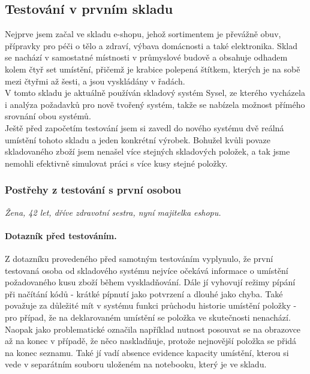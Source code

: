 \subsection{Testování v prvním skladu}

Nejprve jsem začal ve skladu e-shopu, jehož sortimentem je převážně obuv, přípravky pro péči o tělo a zdraví, výbava domácnosti a také elektronika. Sklad se nachází v samostatné místnosti v průmyslové budově a obsahuje odhadem kolem čtyř set umístění, přičemž  je krabice polepená štítkem, kterých je na sobě mezi čtyřmi až šesti, a jsou vyskládány v řadách.\\
V tomto skladu je aktuálně používán skladový systém Sysel, ze kterého vycházela i analýza požadavků pro nově tvořený systém, takže se nabízela možnost přímého srovnání obou systémů.\\
Ještě před započetím testování jsem si zavedl do nového systému dvě reálná umístění tohoto skladu a jeden konkrétní výrobek. Bohužel kvůli povaze skladovaného zboží jsem nenašel více stejných skladových položek, a tak jsme nemohli efektivně simulovat práci s více kusy stejné položky.


\subsubsection{Postřehy z testování s první osobou}
\emph{Žena, 42 let, dříve zdravotní sestra, nyní majitelka eshopu.}

\paragraph{Dotazník před testováním.} Z dotazníku provedeného před samotným testováním vyplynulo, že první testovaná osoba od skladového systému nejvíce očekává informace o umístění požadovaného kusu zboží během vyskladňování. Dále jí vyhovují režimy pípání při načítání kódů - krátké pípnutí jako potvrzení a dlouhé jako chyba. Také považuje za důležité mít v systému funkci průchodu historie umístění položky - pro případ, že na deklarovaném umístění se položka ve skutečnosti nenachází. Naopak jako problematické označila například nutnost posouvat se na obrazovce až na konec v případě, že něco naskladňuje, protože nejnovější položka se přidá na konec seznamu. Také jí vadí absence evidence kapacity umístění, kterou si vede v separátním souboru uloženém na notebooku, který je ve skladu.\\

